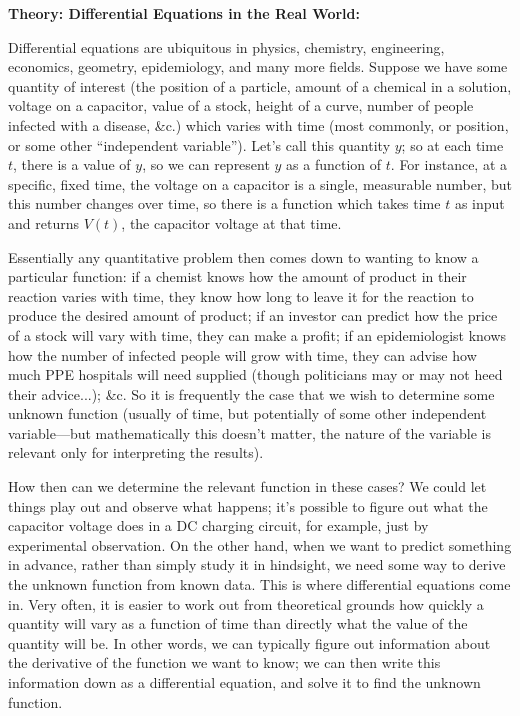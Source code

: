 \documentclass{article}
\begin{document}
\clearpage

\textbf{Theory: Differential Equations in the Real World:}\bigskip

Differential equations are ubiquitous in physics, chemistry, engineering, economics, geometry, epidemiology, and many more fields. Suppose we have some quantity of interest (the position of a particle, amount of a chemical in a solution, voltage on a capacitor, value of a stock, height of a curve, number of people infected with a disease, \&c.) which varies with time (most commonly, or position, or some other ``independent variable''). Let's call this quantity $y$; so at each time $t$, there is a value of $y$, so we can represent $y$ as a function of $t$. For instance, at a specific, fixed time, the voltage on a capacitor is a single, measurable number, but this number changes over time, so there is a function which takes time $t$ as input and returns $V(t)$, the capacitor voltage at that time.

Essentially any quantitative problem then comes down to wanting to know a particular function: if a chemist knows how the amount of product in their reaction varies with time, they know how long to leave it for the reaction to produce the desired amount of product; if an investor can predict how the price of a stock will vary with time, they can make a profit; if an epidemiologist knows how the number of infected people will grow with time, they can advise how much PPE hospitals will need supplied (though politicians may or may not heed their advice...); \&c. So it is frequently the case that we wish to determine some unknown function (usually of time, but potentially of some other independent variable---but mathematically this doesn't matter, the nature of the variable is relevant only for interpreting the results).

How then can we determine the relevant function in these cases? We could let things play out and observe what happens; it's possible to figure out what the capacitor voltage does in a DC charging circuit, for example, just by experimental observation. On the other hand, when we want to predict something in advance, rather than simply study it in hindsight, we need some way to derive the unknown function from known data. This is where differential equations come in. Very often, it is easier to work out from theoretical grounds how quickly a quantity will vary as a function of time than directly what the value of the quantity will be. In other words, we can typically figure out information about the derivative of the function we want to know; we can then write this information down as a differential equation, and solve it to find the unknown function.
\end{document}
